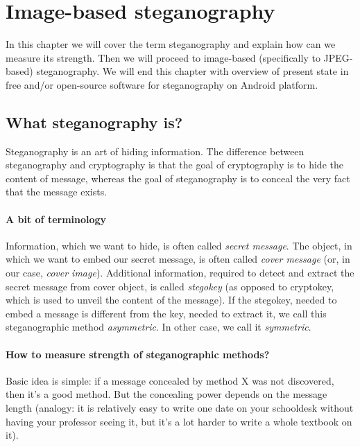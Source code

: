 \chapter{Image-based steganography}

In this chapter we will cover the term steganography and explain 
how can we measure its strength. Then we will proceed to image-based
(specifically to JPEG-based) steganography. We will end this chapter
with overview of present state in free and/or open-source software
for steganography on Android platform.

\section{What steganography is?}

Steganography is an art of hiding information. The difference between steganography and
cryptography is that the goal of cryptography is to hide the content of message, whereas
the goal of steganography is to conceal the very fact that the message exists.

\subsubsection{A bit of terminology}

Information, which we want to hide, is often called \textit{secret message}. The object,
in which we want to embed our secret message, is often called \textit{cover message} (or, in our case,
\textit{cover image}). Additional information, required to detect and extract the secret message
from cover object, is called \textit{stegokey} (as opposed to cryptokey, which is used to 
unveil the content of the message). If the stegokey, needed to embed a message is different
from the key, needed to extract it, we call this steganographic method \textit{asymmetric}. In
other case, we call it \textit{symmetric}.

\subsubsection{How to measure strength of steganographic methods?}

Basic idea is simple: if a message concealed by method X was not discovered, then it's a good method.
But the concealing power depends on the message length (analogy: it is relatively easy
to write one date on your schooldesk without having your professor seeing it, but it's a lot
harder to write a whole textbook on it). 

